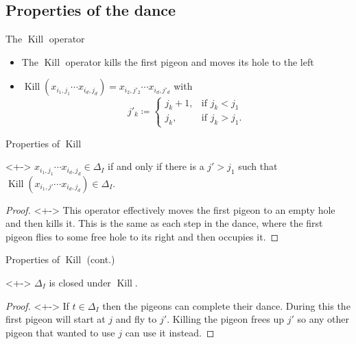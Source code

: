 \documentclass[xcolor={dvipsnames}, aspectratio=169, handout]{beamer}
\renewcommand{\K}{\operatorname{Kill}}
\begin{document}
\subsection{Properties of the dance}
\begin{frame}{The $\K$ operator}
    \begin{itemize}[<+->]
        \item The $\K$ operator kills the first pigeon and moves its hole to the left
        \item $\K(x_{i_1, j_1} \cdots x_{i_d, j_d}) = x_{i_2, j'_2} \cdots x_{i_d, j'_d}$ with\\
            $$j'_k \coloneqq \begin{cases}
                    j_k + 1, &\text{if } j_k < j_1\\
                    j_k, &\text{if } j_k > j_1.
                \end{cases}$$
    \end{itemize}
\end{frame}

\begin{frame}{Properties of $\K$}
    \begin{theorem}<+->
        $x_{i_1, j_1} \cdots x_{i_d, j_d} \in \Delta_I$ if and only if there is a $j' > j_1$ such that $\K(x_{i_1, j'} \cdots x_{i_d, j_d}) \in \Delta_I$.
    \end{theorem}
    \begin{proof}[Proof\nopunct]<+->
        This operator effectively moves the first pigeon to an empty hole and then kills it. This is the same as each step in the dance, where the first pigeon flies to some free hole to its right and then occupies it.
    \end{proof}
\end{frame}

\begin{frame}{Properties of $\K$ (cont.)}
     \begin{theorem}<+->
        $\Delta_I$ is closed under $\K$.
     \end{theorem}
    \begin{proof}[Proof\nopunct]<+->
        If $t \in \Delta_I$ then the pigeons can complete their dance. During this the first pigeon will start at $j$ and fly to $j'$. Killing the pigeon frees up $j'$ so any other pigeon that wanted to use $j$ can use it instead.
    \end{proof}
\end{frame}
\end{document}
